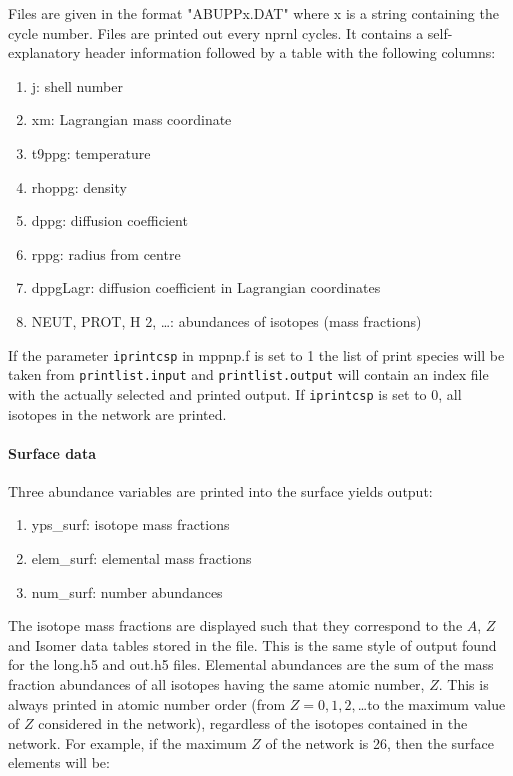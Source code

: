 Files are given in the format "ABUPPx.DAT" where x is a string
containing the cycle number.  Files are printed out every nprnl cycles.
It contains a self-explanatory header information followed by a table
with the following columns:
\begin{enumerate}
  \item j: shell number \\
  \item xm: Lagrangian mass coordinate\\
  \item t9ppg: temperature \\
  \item rhoppg: density \\
  \item dppg: diffusion coefficient \\
  \item rppg: radius from centre\\
  \item dppgLagr: diffusion coefficient in Lagrangian coordinates\\
  \item NEUT, PROT, H 2, \ldots: abundances of isotopes (mass fractions)
\end{enumerate}
If the parameter \texttt{iprintcsp} in mppnp.f is set to 1 the list
of print species will be taken from \texttt{printlist.input} and
\texttt{printlist.output} will contain an index file with the actually
selected and printed output.  If \texttt{iprintcsp} is set to 0, all
isotopes in the network are printed.

\paragraph{Surface data}
Three abundance variables are printed into the surface yields output:

\begin{enumerate}
   \item yps\_surf: isotope mass fractions
   \item elem\_surf: elemental mass fractions
   \item num\_surf: number abundances
\end{enumerate}
The isotope mass fractions are displayed such that they correspond to the $A$,
$Z$ and Isomer data tables stored in the file.  This is the same style of output
found for the long.h5 and out.h5 files.  Elemental abundances are the sum of the
mass fraction abundances of all isotopes having the same atomic number, $Z$.  
This is always printed in atomic number order (from $Z=0, 1, 2, $\dots to the
maximum value of $Z$ considered in the network), regardless of the isotopes
contained in the network.  For example, if the maximum $Z$ of the network is 26, 
then the surface elements will be:

